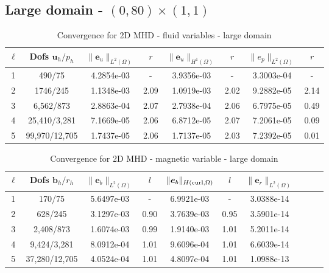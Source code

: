 \documentclass{article}
\newcommand{\uu}[1]{\boldsymbol #1}
\begin{document}
\newpage

\subsection*{Large domain - $(0,80)\times(1,1)$}


\begin{table}[h!]
\begin{center}
\begin{tabular}{cccccccc}
\hline \hline

$\ell$ &    Dofs $\uu{u}_h/p_h$ & $\|\uu{e}_u\|_{L^2(\Omega)}$ & $r$ & $\|\uu{e}_u\|_{H^1(\Omega)}$ & $r$ &$\|e_p\|_{L^2(\Omega)}$ & $r$  \\
\hline
\hline
 1 &    490/75 &  4.2854e-03 &     - &  3.9356e-03 &     - &  3.3003e-04 &      - \\
 2 &   1746/245 &  1.1348e-03 &     2.09 &  1.0919e-03 &     2.02 &  9.2882e-05 &      2.14 \\
 3 &   6,562/873 &  2.8863e-04 &     2.07 &  2.7938e-04 &     2.06 &  6.7975e-05 &      0.49 \\
 4 &  25,410/3,281 &  7.1669e-05 &     2.06 &  6.8712e-05 &     2.07 &  7.2061e-05 &      0.09 \\
 5 &  99,970/12,705 &  1.7437e-05 &     2.06 &  1.7137e-05 &     2.03 &  7.2392e-05 &      0.01 \\

\hline\hline
\end{tabular}

\caption{Convergence for 2D MHD - fluid variables - large domain}
\label{tab:MHD_2D_smooth_fluids_velocity}
\end{center}
\end{table}



\begin{table}[h!]
\begin{center}
\begin{tabular}{cccccccccc}
\hline
\hline
$\ell$ &    Dofs $\uu{b}_h/r_h$ & $\|\uu{e}_b\|_{L^2(\Omega)}$ & $l$ & $\|\uu{e}_b\|_{H({\rm curl},\Omega)}$ & $l$ &$\|\uu{e}_r\|_{L^2(\Omega)}$ \\
\hline\hline

 1 &    170/75 &  5.6497e-03 &     - &  6.9921e-03 &        - & 3.0388e-14\\
 2 &    628/245 &  3.1297e-03 &     0.90 &  3.7639e-03 &        0.95 & 3.5901e-14\\
 3 &   2,408/873 &  1.6074e-03 &     0.99 &  1.9140e-03 &        1.01 & 5.2011e-14\\
 4 &   9,424/3,281 &  8.0912e-04 &     1.01 &  9.6096e-04 &        1.01 & 6.6039e-14\\
 5 &  37,280/12,705 &  4.0524e-04 &     1.01 &  4.8097e-04 &        1.01 & 1.0988e-13\\

\hline\hline


\end{tabular}
\caption{Convergence for 2D MHD  - magnetic variable - large domain}
\label{tab:MHD_2D_smooth_magnetic}
\end{center}
\end{table}
\end{document}
